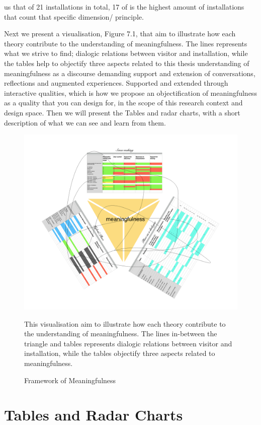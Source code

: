 us that of 21 installations in total, 17 of is the highest amount of installations that count that specific dimension/ principle.

Next we present a visualisation, Figure 7.1, that aim to illustrate how each theory contribute to the understanding of meaningfulness. The lines represents what we strive to find; dialogic relations between visitor and installation, while the tables help to objectify three aspects related to this thesis understanding of meaningfulness as a discourse demanding support and extension of conversations, reflections and augmented experiences. Supported and extended through interactive qualities, which is how we propose an objectification of meaningfulness as a quality that you can design for, in the scope of this research context and design space. Then we will present the Tables and radar charts, with a short description of what we can see and learn from them.

\begin{figure}[H]
\centering
\includegraphics[width=15cm]{pictures/analysis/table_triangle.png}
\caption{Framework of Meaningfulness}{This visualisation aim to illustrate how each theory contribute to the understanding of meaningfulness. The lines in-between the triangle and tables represents dialogic relations between visitor and installation, while the tables objectify three aspects related to meaningfulness.}
\end{figure}

\section{Tables and Radar Charts}

